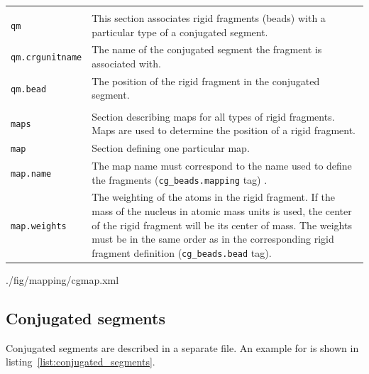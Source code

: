 {\begin{tabular}{p{3cm} p{10cm}}
& \\
\texttt{qm} & This section associates rigid fragments (beads) with a particular type of a conjugated segment. \\
%
\texttt{qm.crgunitname} &  The name of the conjugated segment the fragment is associated with. \\
%
\texttt{qm.bead} & The position of the rigid fragment in the conjugated segment. \\
& \\
\texttt{maps} & Section describing maps for all types of rigid fragments. Maps are used to determine the position of a rigid fragment. \\
%
\texttt{map} &  Section defining one particular map. \\
%
\texttt{map.name} & The map name must correspond to the name used to define the fragments (\texttt{cg\_beads.mapping} tag) . \\
%
\texttt{map.weights} & The weighting of the atoms in the rigid fragment. If the mass of the nucleus in atomic mass units is used, the center of the rigid fragment will be its center of mass. The weights must be in the same order as in the corresponding rigid fragment definition (\texttt{cg\_beads.bead} tag).
\end{tabular}
}

\clearpage



%
{./fig/mapping/cgmap.xml}

\subsection{Conjugated segments}

Conjugated segments are described in a separate \xml file. An example for \dcvt is shown in listing~\ref{list:conjugated_segments}.

